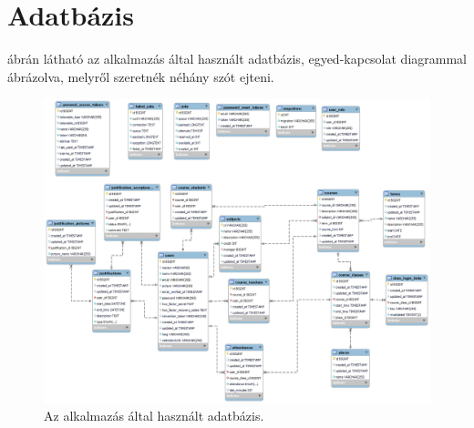 \documentclass[
]{thesis-ekf}
\theoremstyle{definition}
\theoremstyle{remark}
\begin{document}
\section{Adatbázis}

 ábrán látható az alkalmazás által használt adatbázis, egyed-kapcsolat diagrammal ábrázolva, melyről szeretnék néhány szót ejteni.

\begin{figure}[ht!]
	\centering
	\includegraphics[width=15cm]{../pictures/db.png}
	\caption{Az alkalmazás által használt adatbázis.}
	\label{database}
\end{figure}
\end{document}
